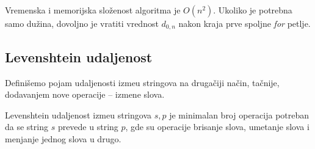 Vremenska i memorijska slo\v zenost algoritma je $O(n^2)$. Ukoliko je potrebna samo du\v zina, dovoljno je vratiti vrednost $d_{0,n}$ nakon kraja prve spoljne \textit{for} petlje.

\subsection{Levenshtein udaljenost}

Defini\v semo pojam udaljenosti izme\dj u stringova na druga\v ciji na\v cin, ta\v cnije, dodavanjem nove operacije -- izmene slova.

\noindent
\begin{minipage}[l]{\textwidth}
\begin{dfn}
Levenshtein udaljenost izme\dj u stringova $s,p$ je minimalan broj operacija potreban da se string $s$ prevede u string $p$, gde su operacije brisanje slova, umetanje slova i menjanje jednog slova u drugo.
\end{dfn}
\end{minipage}


